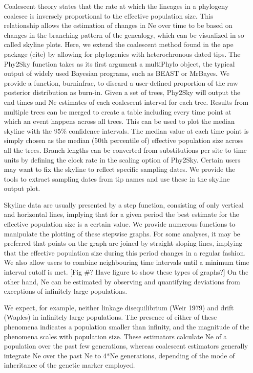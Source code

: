 \documentclass[12pt,a4paper,titlepage]{article}
\begin{document}
Coalescent theory states that the rate at which the lineages in a phylogeny coalesce is inversely proportional to the effective population size. This relationship allows the estimation of changes in Ne over time to be based on changes in the branching pattern of the genealogy, which can be visualized in so-called skyline plots. Here, we extend the coalescent method found in the ape package (cite) by allowing for phylogenies with heterochronous dated tips.
The Phy2Sky function takes as its first argument a multiPhylo object, the typical output of widely used Bayesian programs, such as BEAST or MrBayes. We provide a function, burninfrac, to discard a user-defined proportion of the raw posterior distribution as burn-in. Given a set of trees, Phy2Sky will output the end times and Ne estimates of each coalescent interval for each tree. Results from multiple trees can be merged to create a table including every time point at which an event happens across all trees. This can be used to plot the median skyline with the 95\% confidence intervals. The median value at each time point is simply chosen as the median (50th percentile of) effective population size across all the trees. 
Branch-lengths can be converted from substitutions per site to time units by defining the clock rate in the scaling option of Phy2Sky. Certain users may want to fix the skyline to reflect specific sampling dates. We provide the tools to extract sampling dates from tip names and use these in the skyline output plot.

Skyline data are usually presented by a step function, consisting of only vertical and horizontal lines, implying that for a given period the best estimate for the effective population size is a certain value. We provide numerous functions to manipulate the plotting of these stepwise graphs. For some analyses, it may be preferred that points on the graph are joined by straight sloping lines, implying that the effective population size during this period changes in a regular fashion. We also allow users to combine neighbouring time intervals until a minimum time interval cutoff is met. [Fig \#? Have figure to show these types of graphs?] 
On the other hand, Ne can be estimated by observing and quantifying deviations from exceptions of infinitely large populations. 
  







We expect, for example, neither linkage disequilibrium (Weir 1979) and drift (Waples) in infinitely large populations. The presence of either of these phenomena indicates a population smaller than infinity, and the magnitude of the phenomena scales with population size. These estimators calculate Ne of a population over the past few generations, whereas coalescent estimators generally integrate Ne over the past Ne to 4*Ne generations, depending of the mode of inheritance of the genetic marker employed.
\end{document}
